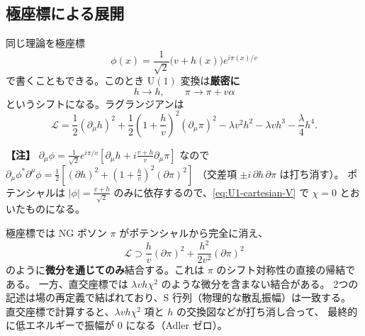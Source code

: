 \documentclass[uplatex,dvipdfmx,a4paper,11pt,openany]{jsbook}
\newenvironment{note}{\vspace{1ex}\par\footnotesize\noindent\textbf{【注】}}{\par\vspace{1ex}}
\numberwithin{equation}{chapter}
\theoremstyle{definition}
\theoremstyle{plain}
\theoremstyle{remark}
\newcommand{\Lag}{\mathcal{L}}
\newcommand{\U}{\mathrm{U}}
\begin{document}
\subsection{極座標による展開}
同じ理論を極座標
\begin{equation}
\phi(x)=\frac{1}{\sqrt2}\bigl(v+h(x)\bigr)e^{i\pi(x)/v}
\label{eq:U1-polar}
\end{equation}
で書くこともできる。このとき $\U(1)$ 変換は\textbf{厳密に}
\begin{equation}
h\to h,\qquad \pi\to\pi+v\alpha
\end{equation}
というシフトになる。ラグランジアンは
\begin{equation}
\Lag=\frac12(\partial_\mu h)^2+\frac12\left(1+\frac hv\right)^2(\partial_\mu\pi)^2
-\lambda v^2h^2-\lambda vh^3-\frac\lambda4h^4 .
\label{eq:U1-polar-L}
\end{equation}
\begin{note}
$\partial_\mu\phi=\frac{1}{\sqrt2}e^{i\pi/v}\left[\partial_\mu h+i\frac{v+h}{v}\partial_\mu\pi\right]$ なので
$\partial_\mu\phi^*\partial^\mu\phi=\frac12\left[(\partial h)^2+\left(1+\frac hv\right)^2(\partial\pi)^2\right]$
（交差項 $\pm i\,\partial h\,\partial\pi$ は打ち消す）。
ポテンシャルは $|\phi|=\frac{v+h}{\sqrt2}$ のみに依存するので、\eqref{eq:U1-cartesian-V} で $\chi=0$ とおいたものになる。
\end{note}
極座標では NG ボソン $\pi$ がポテンシャルから完全に消え、
\begin{equation}
\Lag\supset\frac{h}{v}(\partial\pi)^2+\frac{h^2}{2v^2}(\partial\pi)^2
\end{equation}
のように\textbf{微分を通じてのみ}結合する。これは $\pi$ のシフト対称性の直接の帰結である。
一方、直交座標では $\lambda vh\chi^2$ のような微分を含まない結合がある。
2つの記述は場の再定義で結ばれており、S 行列（物理的な散乱振幅）は一致する。
直交座標で計算すると、$\lambda vh\chi^2$ 項と $h$ の交換図などが打ち消し合って、
最終的に低エネルギーで振幅が 0 になる（Adler ゼロ）。
\end{document}
